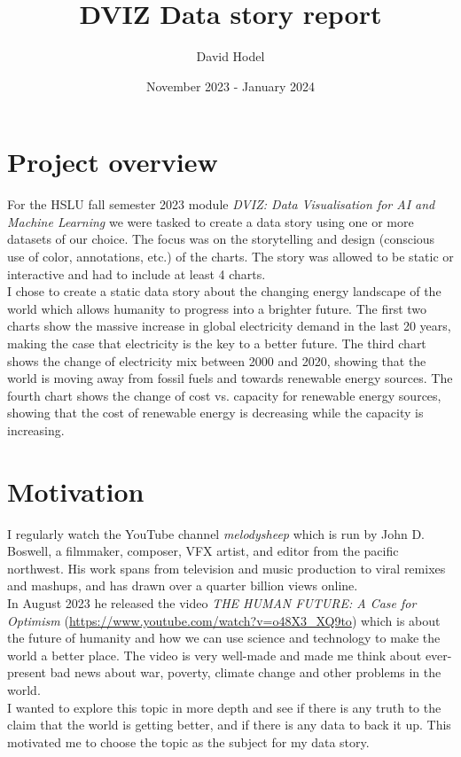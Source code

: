 \documentclass{article}
\title{DVIZ Data story report}
\author{David Hodel}
\date{November 2023 - January 2024}
\begin{document}
\maketitle
\newpage

\tableofcontents
\newpage

\section{Project overview}
For the HSLU fall semester 2023 module \textit{DVIZ: Data Visualisation for AI and Machine Learning} we were tasked to create a data story
using one or more datasets of our choice. The focus was on the storytelling and design (conscious use of color, annotations, etc.) of the charts.
The story was allowed to be static or interactive and had to include at least 4 charts. \\
I chose to create a static data story about the changing energy landscape of the world which allows humanity to progress into a brighter future.
The first two charts show the massive increase in global electricity demand in the last 20 years, making the case that electricity is the key to a better future.
The third chart shows the change of electricity mix between 2000 and 2020, showing that the world is moving away from fossil fuels and towards renewable energy sources.
The fourth chart shows the change of cost vs. capacity for renewable energy sources, showing that the cost of renewable energy is decreasing while the capacity is increasing. \\

\section{Motivation}
I regularly watch the YouTube channel \textit{melodysheep} which is run by John D. Boswell, a filmmaker, composer, VFX artist, and editor from the pacific northwest. 
His work spans from television and music production to viral remixes and mashups,
and has drawn over a quarter billion views online. \\
In August 2023 he released the video \textit{THE HUMAN FUTURE: A Case for Optimism} (\url{https://www.youtube.com/watch?v=o48X3\_XQ9to})
which is about the future of humanity and how we can use science and technology to make the world a better place.
The video is very well-made and made me think about ever-present bad news about war, poverty, climate change and other problems in the world. \\
I wanted to explore this topic in more depth and see if there is any truth to the claim that the world is getting better, and if there is any data to back it up.
This motivated me to choose the topic as the subject for my data story.
\end{document}
